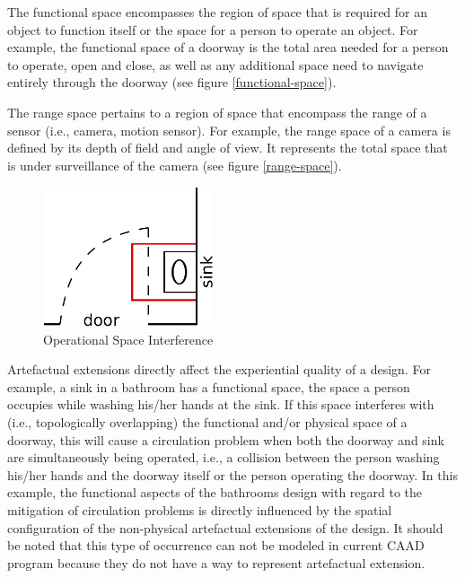 \documentclass[12pt]{ucthesis}
\begin{document}
The functional space encompasses the region of space that is required for an object to function itself or the space for a person to operate an object. For example, the functional space of a doorway is the total area needed for a person to operate, open and close, as well as any additional space need to navigate entirely through the doorway (see figure \ref{functional-space}). 

The range space pertains to a region of space that encompass the range of a sensor (i.e., camera, motion sensor). For example, the range space of a camera is defined by its depth of field and angle of view. It represents the total space that is under surveillance of the camera (see figure \ref{range-space}).

\begin{figure}[H]
\centering
\includegraphics[width=50mm]{door-sink}
\caption{Operational Space Interference}
\label{door-sink}
\end{figure}

Artefactual extensions directly affect the experiential quality of a design. For example, a sink in a bathroom has a functional space, the space a person occupies while washing his/her hands at the sink. If this space interferes with (i.e., topologically overlapping) the functional and/or physical space of a doorway, this will cause a circulation problem when both the doorway and sink are simultaneously being operated, i.e., a collision between the person washing his/her hands and the doorway itself or the person operating the doorway. In this example, the functional aspects of the bathrooms design with regard to the mitigation of circulation problems is directly influenced by the spatial configuration of the non-physical artefactual extensions of the design. It should be noted that this type of occurrence can not be modeled in current CAAD program because they do not have a way to represent artefactual extension.
\end{document}
